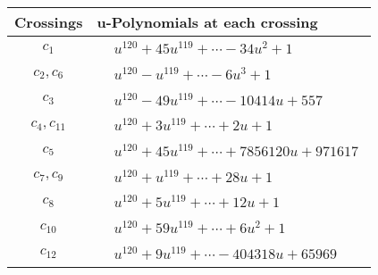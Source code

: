 \documentclass[1p]{elsarticle_modified}
\theoremstyle{definition}
\begin{document}
\begin{tabular}{m{50pt}|m{274pt}}
Crossings & \hspace{64pt}u-Polynomials at each crossing \\
\hline $$\begin{aligned}c_{1}\end{aligned}$$&$\begin{aligned}
&u^{120}+45 u^{119}+\cdots-34 u^2+1
\end{aligned}$\\
\hline $$\begin{aligned}c_{2},c_{6}\end{aligned}$$&$\begin{aligned}
&u^{120}- u^{119}+\cdots-6 u^3+1
\end{aligned}$\\
\hline $$\begin{aligned}c_{3}\end{aligned}$$&$\begin{aligned}
&u^{120}-49 u^{119}+\cdots-10414 u+557
\end{aligned}$\\
\hline $$\begin{aligned}c_{4},c_{11}\end{aligned}$$&$\begin{aligned}
&u^{120}+3 u^{119}+\cdots+2 u+1
\end{aligned}$\\
\hline $$\begin{aligned}c_{5}\end{aligned}$$&$\begin{aligned}
&u^{120}+45 u^{119}+\cdots+7856120 u+971617
\end{aligned}$\\
\hline $$\begin{aligned}c_{7},c_{9}\end{aligned}$$&$\begin{aligned}
&u^{120}+u^{119}+\cdots+28 u+1
\end{aligned}$\\
\hline $$\begin{aligned}c_{8}\end{aligned}$$&$\begin{aligned}
&u^{120}+5 u^{119}+\cdots+12 u+1
\end{aligned}$\\
\hline $$\begin{aligned}c_{10}\end{aligned}$$&$\begin{aligned}
&u^{120}+59 u^{119}+\cdots+6 u^2+1
\end{aligned}$\\
\hline $$\begin{aligned}c_{12}\end{aligned}$$&$\begin{aligned}
&u^{120}+9 u^{119}+\cdots-404318 u+65969
\end{aligned}$\\
\hline
\end{tabular}\newpage\renewcommand{\arraystretch}{1}
\end{document}
